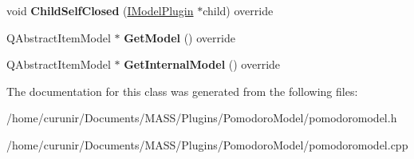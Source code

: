 \begin{DoxyCompactItemize}
\item 
void {\bfseries Child\+Self\+Closed} (\hyperlink{class_i_model_plugin}{I\+Model\+Plugin} $\ast$child) override\hypertarget{class_pomodoro_model_a90ce59705d85cc0cf463cf7cedb71c03}{}\label{class_pomodoro_model_a90ce59705d85cc0cf463cf7cedb71c03}

\item 
Q\+Abstract\+Item\+Model $\ast$ {\bfseries Get\+Model} () override\hypertarget{class_pomodoro_model_a809e190e4f57bd457978aa8e007229b7}{}\label{class_pomodoro_model_a809e190e4f57bd457978aa8e007229b7}

\item 
Q\+Abstract\+Item\+Model $\ast$ {\bfseries Get\+Internal\+Model} () override\hypertarget{class_pomodoro_model_a3d96a6b665bdfc0b3fbad7411775a762}{}\label{class_pomodoro_model_a3d96a6b665bdfc0b3fbad7411775a762}

\end{DoxyCompactItemize}


The documentation for this class was generated from the following files\+:\begin{DoxyCompactItemize}
\item 
/home/curunir/\+Documents/\+M\+A\+S\+S/\+Plugins/\+Pomodoro\+Model/pomodoromodel.\+h\item 
/home/curunir/\+Documents/\+M\+A\+S\+S/\+Plugins/\+Pomodoro\+Model/pomodoromodel.\+cpp\end{DoxyCompactItemize}
